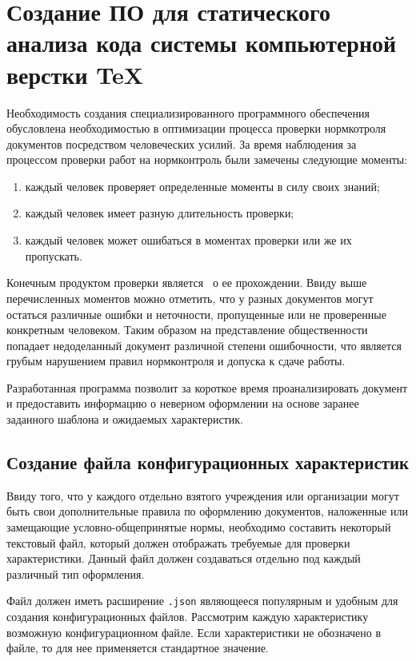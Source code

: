 \chapter{Создание ПО для статического анализа кода системы компьютерной верстки TeX}

Необходимость создания специализированного программного обеспечения обусловлена необходимостью в оптимизации процесса проверки нормкотроля документов посредством человеческих усилий. За время наблюдения за процессом проверки работ на нормконтроль были замечены следующие моменты:

\begin{enumerate}
    \item каждый человек проверяет определенные моменты в силу своих знаний;
    \item каждый человек имеет разную длительность проверки;
    \item каждый человек может ошибаться в моментах проверки или же их пропускать.
\end{enumerate}

Конечным продуктом проверки является \guillemotright\verb| |о ее прохождении. Ввиду выше перечисленных моментов можно отметить, что у разных документов могут остаться различные ошибки и неточности, пропущенные или не проверенные конкретным человеком. Таким образом на представление общественности попадает недоделанный документ различной степени ошибочности, что является грубым нарушением правил нормконтроля и допуска к сдаче работы.

Разработанная программа позволит за короткое время проанализировать документ и предоставить информацию о неверном оформлении на основе заранее заданного шаблона и ожидаемых характеристик.

\section{Создание файла конфигурационных характеристик}

Ввиду того, что у каждого отдельно взятого учреждения или организации могут быть свои дополнительные правила по оформлению документов, наложенные или замещающие условно-общепринятые нормы, необходимо составить некоторый текстовый файл, который должен отображать требуемые для проверки характеристики. Данный файл должен создаваться отдельно под каждый различный тип оформления.

Файл должен иметь расширение \verb|.json| являющееся популярным и удобным для создания конфигурационных файлов. Рассмотрим каждую характеристику возможную конфигурационном файле. Если характеристики не обозначено в файле, то для нее применяется стандартное значение.

